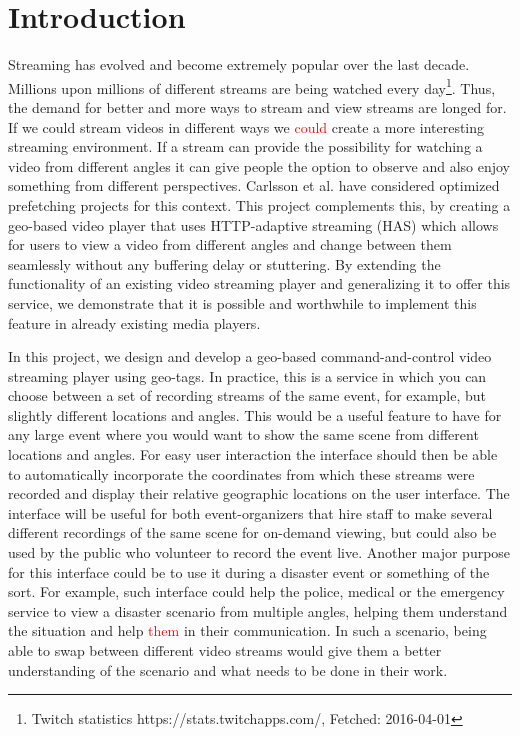 \chapter{Introduction}
\label{cha:introduction}

Streaming has evolved and become extremely popular over the last decade. Millions upon millions of different streams are being watched every day\footnote{Twitch statistics https://stats.twitchapps.com/, Fetched: 2016-04-01}. Thus, the demand for better and more ways to stream and view streams are longed for. If we could stream videos in different ways we \textcolor{red}{could} create a more interesting streaming environment. If a stream can provide the possibility for watching a video from different angles it can give people the option to observe and also enjoy something from different perspectives. Carlsson et al.\cite{optimizedstreaming} have considered optimized prefetching projects for this context. This project complements this, by creating a geo-based video player that uses HTTP-adaptive streaming (HAS) which allows for users to view a video from different angles and change between them seamlessly without any buffering delay or stuttering. By extending the functionality of an existing video streaming player and generalizing it to offer this service, we demonstrate that it is possible and worthwhile to implement this feature in already existing media players.

In this project, we design and develop a geo-based command-and-control video streaming player using geo-tags. In practice, this is a service in which you can choose between a set of recording streams of the same event, for example, but slightly different locations and angles. This would be a useful feature to have for any large event where you would want to show the same scene from different locations and angles. For easy user interaction the interface should then be able to automatically incorporate the coordinates from which these streams were recorded and display their relative geographic locations on the user interface. The interface will be useful for both event-organizers that hire staff to make several different recordings of the same scene for on-demand viewing, but could also be used by the public who volunteer to record the event live. Another major purpose for this interface could be to use it during a disaster event or something of the sort. For example, such interface could help the police, medical or the emergency service to view a disaster scenario from multiple angles, helping them understand the situation and help \textcolor{red}{them} in their communication. In such a scenario, being able to swap between different video streams would give them a better understanding of the scenario and what needs to be done in their work.

